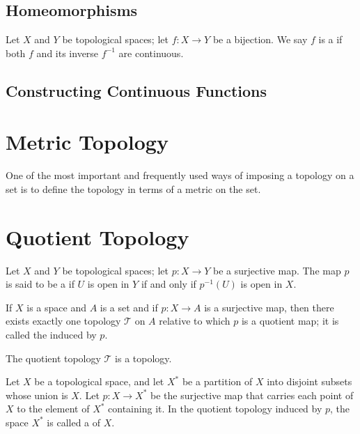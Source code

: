 \subsection{Homeomorphisms}
\begin{definition}
Let $X$ and $Y$ be topological spaces; let $f\colon X\to Y$ be a bijection. 
We say $f$ is a  if both $f$ and its inverse $f^{-1}$ are continuous.
\end{definition}

\subsection{Constructing Continuous Functions}


\section{Metric Topology}
One of the most important and frequently used ways of imposing a topology on a set is to define the topology in terms of a metric on the set.

\begin{definition}

\end{definition}

\section{Quotient Topology}
\begin{definition}
Let $X$ and $Y$ be topological spaces; let $p\colon X\to Y$ be a surjective map.
The map $p$ is said to be a  if $U$ is open in $Y$ if and only if $p^{-1}(U)$ is open in $X$.
\end{definition}

\begin{definition}
If $X$ is a space and $A$ is a set and if $p\colon X\to A$ is a surjective map, then there exists exactly one topology $\mathcal{T}$ on $A$ relative to which $p$ is a quotient map; it is called the  induced by $p$.
\end{definition}

\begin{lemma*}
The quotient topology $\mathcal{T}$ is a topology.
\end{lemma*}

\begin{definition}
Let $X$ be a topological space, and let $X^*$ be a partition of $X$ into disjoint subsets whose union is $X$. Let $p\colon X\to X^*$ be the surjective map that carries each point of $X$ to the element of $X^*$ containing it. In the quotient topology induced by $p$, the space $X^*$ is called a  of $X$.
\end{definition}